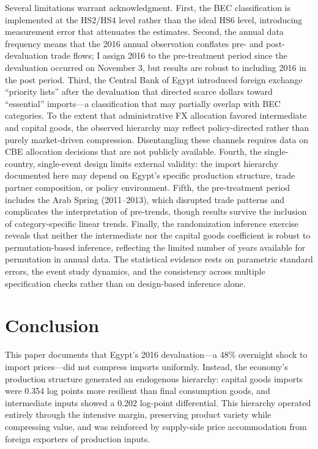 \documentclass[12pt]{article}
\begin{document}
Several limitations warrant acknowledgment. First, the BEC classification is implemented at the HS2/HS4 level rather than the ideal HS6 level, introducing measurement error that attenuates the estimates. Second, the annual data frequency means that the 2016 annual observation conflates pre- and post-devaluation trade flows; I assign 2016 to the pre-treatment period since the devaluation occurred on November 3, but results are robust to including 2016 in the post period. Third, the Central Bank of Egypt introduced foreign exchange ``priority lists'' after the devaluation that directed scarce dollars toward ``essential'' imports---a classification that may partially overlap with BEC categories. To the extent that administrative FX allocation favored intermediate and capital goods, the observed hierarchy may reflect policy-directed rather than purely market-driven compression. Disentangling these channels requires data on CBE allocation decisions that are not publicly available. Fourth, the single-country, single-event design limits external validity: the import hierarchy documented here may depend on Egypt's specific production structure, trade partner composition, or policy environment. Fifth, the pre-treatment period includes the Arab Spring (2011--2013), which disrupted trade patterns and complicates the interpretation of pre-trends, though results survive the inclusion of category-specific linear trends. Finally, the randomization inference exercise reveals that neither the intermediate nor the capital goods coefficient is robust to permutation-based inference, reflecting the limited number of years available for permutation in annual data. The statistical evidence rests on parametric standard errors, the event study dynamics, and the consistency across multiple specification checks rather than on design-based inference alone.


\section{Conclusion}

This paper documents that Egypt's 2016 devaluation---a 48\% overnight shock to import prices---did not compress imports uniformly. Instead, the economy's production structure generated an endogenous hierarchy: capital goods imports were 0.354 log points more resilient than final consumption goods, and intermediate inputs showed a 0.202 log-point differential. This hierarchy operated entirely through the intensive margin, preserving product variety while compressing value, and was reinforced by supply-side price accommodation from foreign exporters of production inputs.
\end{document}
